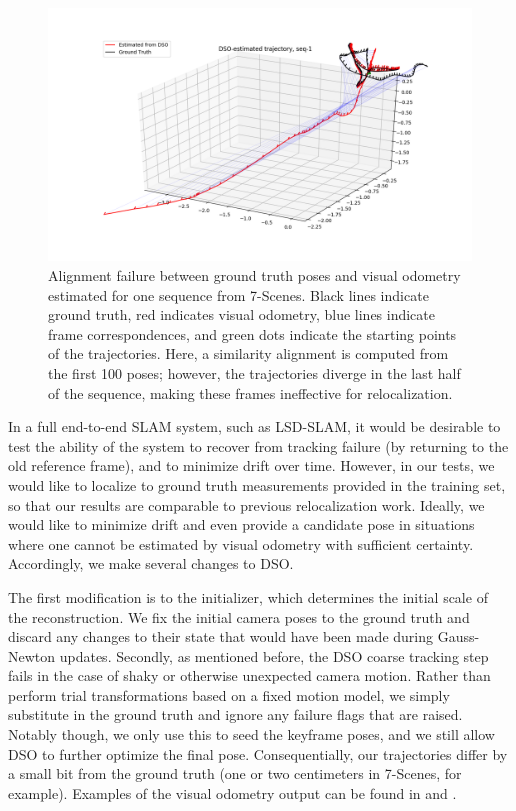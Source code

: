 \begin{figure}[h]
	\centering
	\includegraphics[width=0.8\linewidth]{experiments/alignment_failure.png}
	\caption{Alignment failure between ground truth poses and visual odometry estimated for one sequence from 7-Scenes. Black lines indicate ground truth, red indicates visual odometry, blue lines indicate frame correspondences, and green dots indicate the starting points of the trajectories. Here, a similarity alignment is computed from the first 100 poses; however, the trajectories diverge in the last half of the sequence, making these frames ineffective for relocalization.}
	\label{fig:alignment_failure}
\end{figure}

In a full end-to-end SLAM system, such as LSD-SLAM, it would be desirable to test the ability of the system to recover from tracking failure (by returning to the old reference frame), and to minimize drift over time. However, in our tests, we would like to localize to ground truth measurements provided in the training set, so that our results are comparable to previous relocalization work. Ideally, we would like to minimize drift and even provide a candidate pose in situations where one cannot be estimated by visual odometry with sufficient certainty. Accordingly, we make several changes to DSO. 

The first modification is to the initializer, which determines the initial scale of the reconstruction. We fix the initial camera poses to the ground truth and discard any changes to their state  that would have been made during Gauss-Newton updates. Secondly, as mentioned before, the DSO coarse tracking step fails in the case of shaky or otherwise unexpected camera motion. Rather than perform trial transformations based on a fixed motion model, we simply substitute in the ground truth and ignore any failure flags that are raised. Notably though, we only use this to seed the keyframe poses, and we still allow DSO to further optimize the final pose. Consequentially, our trajectories differ by a small bit from the ground truth (one or two centimeters in 7-Scenes, for example). Examples of the visual odometry output can be found in  and .

